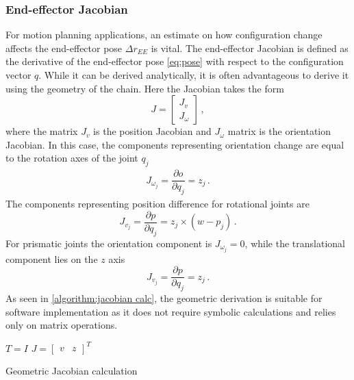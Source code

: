 \documentclass[times, utf8, diplomski, english]{fer}
\begin{document}
\subsubsection{End-effector Jacobian}
For motion planning applications, an estimate on how configuration change affects the end-effector pose $\Delta r_{EE}$ is vital.
The end-effector Jacobian is defined as the derivative of the end-effector pose \eqref{eq:pose} with respect to the configuration vector $q$.
While it can be derived analytically, it is often advantageous to derive it using the geometry of the chain.
Here the Jacobian takes the form 
\begin{equation}
J =
\begin{bmatrix}
J_{v} \\ 
J_{\omega}
\end{bmatrix}\, ,
\label{jacob1}
\end{equation}
where the matrix $J_v$ is the position Jacobian and $J_{\omega}$ matrix is the orientation Jacobian.
In this case, the components representing orientation change are equal to the rotation axes of the joint $q_j$
\begin{align}
J_{\omega_j} = \dfrac{\partial o}{\partial q_j} = z_{j}\, .
\end{align}
The components representing position difference for rotational joints are
\begin{equation}
J_{v_j} = \dfrac{\partial p}{ \partial q_{j}} = z_j \times (w - p_j)\, .
\end{equation}
For prismatic joints the orientation component is $J_{\omega_j} = 0$, while the translational component lies on the $z$ axis
\begin{equation}
J_{v_j} = \dfrac{\partial p}{ \partial q_j} = z_j\, .
\end{equation}
As seen in \autoref{algorithm:jacobian calc}, the geometric derivation is suitable for software implementation as it does not require symbolic calculations and relies only on matrix operations.
\begin{algorithm}[h]
 $T=I$\;
 $J = \begin{bmatrix}v &z \end{bmatrix}^T$ 
 \caption{Geometric Jacobian calculation}
 \label{algorithm:jacobian calc}
\end{algorithm}
\end{document}
